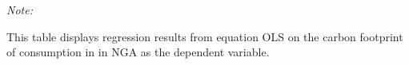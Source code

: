 \begin{table}[htbp!]
\begin{adjustbox}{width = 1\textwidth, max height = 0.95\textheight, center}
\begin{threeparttable}[b]
         \begin{tablenotes}\item \medskip \textit{Note:}
            \item This table displays regression results from equation OLS on the carbon footprint of consumption in  in NGA as the dependent variable.  
         \end{tablenotes}
      \end{threeparttable}
   \end{adjustbox}
\end{table}


